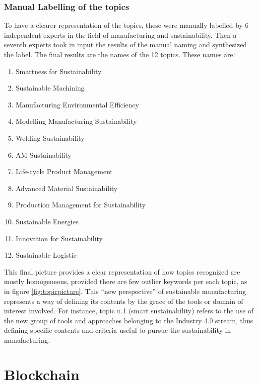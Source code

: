 \documentclass[b5paper,]{book}
\providecommand{\tightlist}{%
  \setlength{\itemsep}{0pt}\setlength{\parskip}{0pt}}
\theoremstyle{definition}
\theoremstyle{definition}
\theoremstyle{definition}
\theoremstyle{remark}
\begin{document}
\subsubsection*{Manual Labelling of the
topics}\label{manual-labelling-of-the-topics}

To have a clearer representation of the topics, these were manually
labelled by 6 independent experts in the field of manufacturing and
sustainability. Then a seventh experts took in input the results of the
manual naming and synthesized the label. The final results are the names
of the 12 topics. These names are:

\begin{enumerate}
\def\labelenumi{\arabic{enumi}.}
\tightlist
\item
  Smartness for Sustainability
\item
  Sustainable Machining
\item
  Manufacturing Environmental Efficiency
\item
  Modelling Manufacturing Sustainability
\item
  Welding Sustainability
\item
  AM Sustainability
\item
  Life-cycle Product Management
\item
  Advanced Material Sustainability
\item
  Production Management for Sustainability
\item
  Sustainable Energies
\item
  Innovation for Sustainability
\item
  Sustainable Logistic
\end{enumerate}

This final picture provides a clear representation of how topics
recognized are mostly homogeneous, provided there are few outlier
keywords per each topic, as in figure \ref{fig:topicpicture}. This ``new
perspective'' of sustainable manufacturing represents a way of defining
its contents by the grace of the tools or domain of interest involved.
For instance, topic n.1 (smart sustainability) refers to the use of the
new group of tools and approaches belonging to the Industry 4.0 stream,
thus defining specific contents and criteria useful to pursue the
sustainability in manufacturing.

\section{Blockchain}\label{blockchainanalysis}
\end{document}
